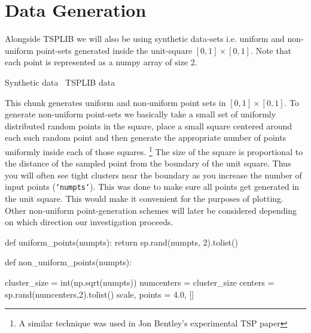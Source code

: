 \section{Data Generation}

Alongside TSPLIB we will also be using synthetic data-sets i.e. uniform and non-uniform point-sets generated inside the unit-square $[0,1] \times [0,1]$. 
Note that each point is represented as a numpy array of size 2. 

\nwenddocs{}\endmoddef\nwstartdeflinemarkup{}\nwenddeflinemarkup
\LA{}Synthetic data~{\nwtagstyle{}}\RA{}
\LA{}TSPLIB data~{\nwtagstyle{}}\RA{}
\nwendcode{}\nwdocspar

This chunk generates uniform and non-uniform point sets in $[0,1] \times [0,1]$. To generate non-uniform point-sets we basically 
take a small set of uniformly distributed random points in the square, place a small square centered around each such random point and then
generate the appropriate number of points uniformly inside each of those squares. \footnote{A similar technique was used in Jon Bentley's experimental TSP paper}
The size of the square is proportional to the distance of the sampled point from the boundary of the unit square. Thus you will often see tight clusters
near the boundary as you increase the number of input points (\texttt{`numpts`}). This was done to make sure all points get generated in the unit square. 
This would make it convenient for the purposes of plotting. Other non-uniform point-generation schemes will later be considered depending on which 
direction our investigation proceeds. 


\nwenddocs{}\endmoddef\nwstartdeflinemarkup{}\nwenddeflinemarkup
def uniform_points(numpts):
     return  sp.rand(numpts, 2).tolist()

def non_uniform_points(numpts):

    cluster_size = int(np.sqrt(numpts)) 
    numcenters   = cluster_size
    centers      = sp.rand(numcenters,2).tolist()
    scale, points = 4.0, []

